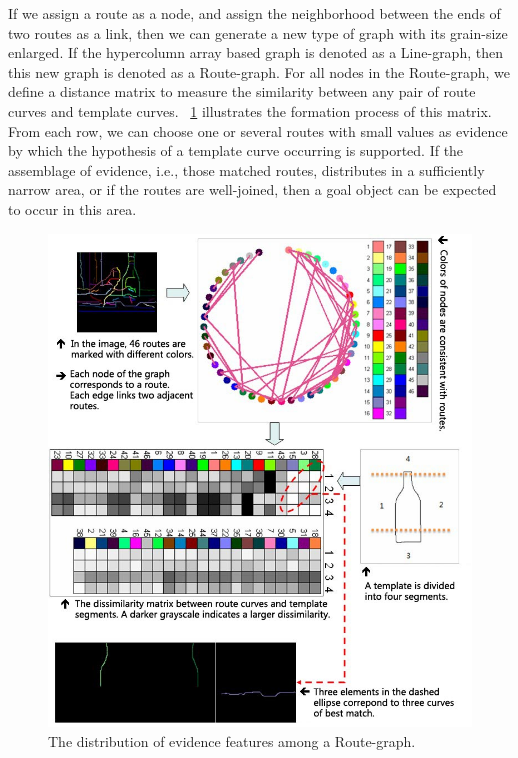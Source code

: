 \documentclass[journal]{IEEEtran}
\begin{document}
If we assign a route as a node, and assign the neighborhood between the ends of two routes as a link, 
then we can generate a new type of graph with its grain-size enlarged. 
If the hypercolumn array based graph is denoted as a Line-graph, then this new graph is denoted as a Route-graph. 
For all nodes in the Route-graph, we define a distance matrix to measure the similarity between any pair of route curves and template curves. 
\figurename~\ref{fig:15} illustrates the formation process of this matrix. 
From each row, we can choose one or several routes with small values as evidence by which the hypothesis of a template curve occurring is supported. 
If the assemblage of evidence, i.e., those matched routes, distributes in a sufficiently narrow area, 
or if the routes are well-joined, then a goal object can be expected to occur in this area.

\begin{figure}[!t]
\centering
\includegraphics[width=0.9\linewidth]{images/fig15.jpg}
\caption{The distribution of evidence features among a Route-graph.}
\label{fig:15}
\end{figure}
\end{document}
